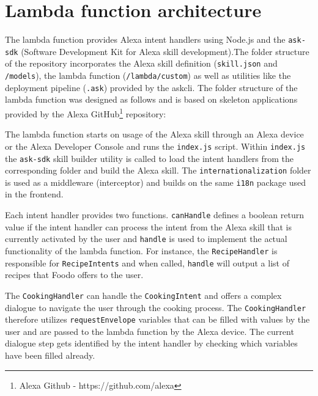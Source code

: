 \section{Lambda function architecture} \label{lambda}

The lambda function provides Alexa intent handlers using Node.js and the \texttt{ask-sdk} (Software Development Kit for Alexa skill development).The folder structure of the repository incorporates the Alexa skill definition (\texttt{skill.json} and \texttt{/models}), the lambda function (\texttt{/lambda/custom}) as well as utilities like the deployment pipeline (\texttt{.ask}) provided by the \gls{askcli}. The folder structure of the lambda function was designed as follows and is based on skeleton applications provided by the Alexa GitHub\footnote{Alexa Github - https://github.com/alexa} repository: \vspace{1em}


The lambda function starts on usage of the Alexa skill through an Alexa device or the Alexa Developer Console and runs the \texttt{index.js} script. Within \texttt{index.js} the \texttt{ask-sdk} skill builder utility is called to load the intent handlers from the corresponding folder and build the Alexa skill. The \texttt{internationalization} folder is used as a middleware (interceptor) and builds on the same \texttt{i18n} package used in the frontend. 

Each intent handler provides two functions. \texttt{canHandle} defines a boolean return value if the intent handler can process the intent from the Alexa skill that is currently activated by the user and \texttt{handle} is used to implement the actual functionality of the lambda function. For instance, the \texttt{RecipeHandler} is responsible for \texttt{RecipeIntents} and when called, \texttt{handle} will output a list of recipes that Foodo offers to the user. 

The \texttt{CookingHandler} can handle the \texttt{CookingIntent} and offers a complex dialogue to navigate the user through the cooking process. The \texttt{CookingHandler} therefore utilizes \texttt{requestEnvelope} variables that can be filled with values by the user and are passed to the lambda function by the Alexa device. The current dialogue step gets identified by the intent handler by checking which variables have been filled already. 

